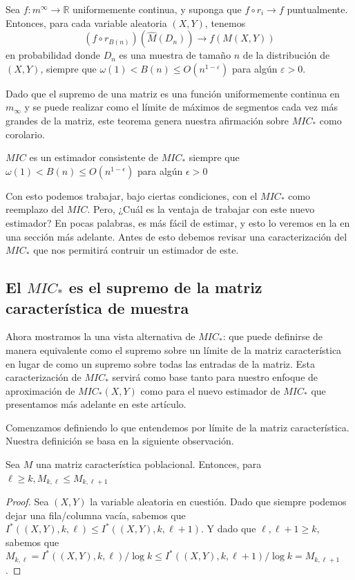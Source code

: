 	\begin{thm}
		Sea $f: m^{\infty} \rightarrow \mathbb{R}$ uniformemente continua, y suponga que $f \circ r_i \rightarrow f$ puntualmente. Entonces, para cada variable aleatoria $(X, Y)$, tenemos
		$$
		\left(f \circ r_{B(n)}\right)\left(\widehat{M}\left(D_n\right)\right) \rightarrow f(M(X, Y))
		$$
		en probabilidad donde $D_n$ es una muestra de tama\~no $n$ de la distribuci\'on de $(X, Y)$, siempre que $\omega(1)<B(n) \leq O\left(n^{1-\varepsilon}\right)$ para alg\'un $\varepsilon>0$.
	\end{thm}

	Dado que el supremo de una matriz es una funci\'on uniformemente continua en $m_\infty$ y se puede realizar como el l\'imite de m\'aximos de segmentos cada vez m\'as grandes de la matriz, este teorema genera nuestra afirmaci\'on sobre $MIC_*$ como corolario.

	\begin{cor}
		$MIC$ es un estimador consistente de $MIC_*$ siempre que $\omega(1) < B(n) \leq O(n^{1-\epsilon})$ para alg\'un $\epsilon > 0$
	\end{cor}

	Con esto podemos trabajar, bajo ciertas condiciones, con el $MIC_*$ como reemplazo del $MIC$. Pero, ¿Cu\'al es la ventaja de trabajar con este nuevo estimador? En pocas palabras, es m\'as f\'acil de estimar, y esto lo veremos en la en una secci\'on m\'as adelante. Antes de esto debemos revisar una caracterizaci\'on del $MIC_*$ que nos permitir\'a contruir un estimador de este.

	\subsection[El MIC star es el supremo de la matriz caracteristica de muestra]{El $MIC_*$ es el supremo de la matriz caracter\'istica de muestra}

	Ahora mostramos la una vista alternativa de $MIC_*$: que puede definirse de manera equivalente como el supremo sobre un l\'imite de la matriz caracter\'istica en lugar de como un supremo sobre todas las entradas de la matriz. Esta caracterizaci\'on de $MIC_*$ servir\'a como base tanto para nuestro enfoque de aproximaci\'on de $MIC_*(X, Y)$ como para el nuevo estimador de $MIC_*$ que presentamos m\'as adelante en este art\'iculo.

	Comenzamos definiendo lo que entendemos por l\'imite de la matriz caracter\'istica. Nuestra definici\'on se basa en la siguiente observaci\'on.
	\begin{prop}
		Sea $M$ una matriz caracter\'istica poblacional. Entonces, para $\ell \geq k, M_{k, \ell} \leq M_{k, \ell+1}$
	\end{prop}
	\begin{proof}
		Sea $(X, Y)$ la variable aleatoria en cuesti\'on. Dado que siempre podemos dejar una fila/columna vac\'ia, sabemos que $I^*((X, Y), k, \ell) \leq I^*((X, Y), k, \ell+1)$. Y dado que $\ell, \ell+1 \geq k$, sabemos que $M_{k, \ell}=I^*((X, Y), k, \ell) / \log k \leq I^*((X, Y), k, \ell+1) / \log k=M_{k, \ell+1}$.
	\end{proof}

